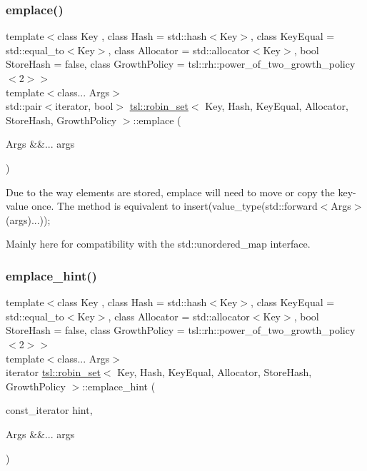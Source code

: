 \subsubsection{\texorpdfstring{emplace()}{emplace()}}
{\footnotesize\ttfamily template$<$class Key , class Hash  = std\+::hash$<$\+Key$>$, class Key\+Equal  = std\+::equal\+\_\+to$<$\+Key$>$, class Allocator  = std\+::allocator$<$\+Key$>$, bool Store\+Hash = false, class Growth\+Policy  = tsl\+::rh\+::power\+\_\+of\+\_\+two\+\_\+growth\+\_\+policy$<$2$>$$>$ \\
template$<$class... Args$>$ \\
std\+::pair$<$iterator, bool$>$ \mbox{\hyperlink{classtsl_1_1robin__set}{tsl\+::robin\+\_\+set}}$<$ Key, Hash, Key\+Equal, Allocator, Store\+Hash, Growth\+Policy $>$\+::emplace (\begin{DoxyParamCaption}\item[{Args \&\&...}]{args }\end{DoxyParamCaption})\hspace{0.3cm}{\ttfamily [inline]}}

Due to the way elements are stored, emplace will need to move or copy the key-\/value once. The method is equivalent to insert(value\+\_\+type(std\+::forward$<$\+Args$>$(args)...));

Mainly here for compatibility with the std\+::unordered\+\_\+map interface. \mbox{\label{classtsl_1_1robin__set_abc4f08f83e5d7793a1fc9360575788cf}} 
\subsubsection{\texorpdfstring{emplace\_hint()}{emplace\_hint()}}
{\footnotesize\ttfamily template$<$class Key , class Hash  = std\+::hash$<$\+Key$>$, class Key\+Equal  = std\+::equal\+\_\+to$<$\+Key$>$, class Allocator  = std\+::allocator$<$\+Key$>$, bool Store\+Hash = false, class Growth\+Policy  = tsl\+::rh\+::power\+\_\+of\+\_\+two\+\_\+growth\+\_\+policy$<$2$>$$>$ \\
template$<$class... Args$>$ \\
iterator \mbox{\hyperlink{classtsl_1_1robin__set}{tsl\+::robin\+\_\+set}}$<$ Key, Hash, Key\+Equal, Allocator, Store\+Hash, Growth\+Policy $>$\+::emplace\+\_\+hint (\begin{DoxyParamCaption}\item[{const\+\_\+iterator}]{hint,  }\item[{Args \&\&...}]{args }\end{DoxyParamCaption})\hspace{0.3cm}{\ttfamily [inline]}}

